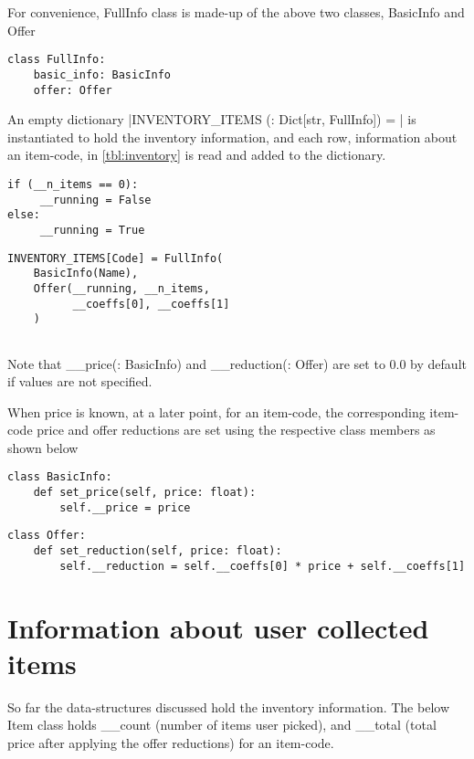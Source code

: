 \documentclass[11pt,a4paper,oneside,onecolumn]{article}
\begin{document}
For convenience, FullInfo class is made-up of the above two classes, BasicInfo and Offer

\begin{verbatim}
class FullInfo:
    basic_info: BasicInfo
    offer: Offer
\end{verbatim}

 An empty dictionary 
  |INVENTORY_ITEMS (: Dict[str, FullInfo]) = {}|
 is instantiated to hold the inventory information, and each row,
 information about an item-code, in \cref{tbl:inventory} is read and added to the dictionary.
 
 \begin{multicols}{2}
 \begin{verbatim}
if (__n_items == 0):
     __running = False
else:
     __running = True
     \end{verbatim}
     
     
\vfill

\begin{verbatim}
INVENTORY_ITEMS[Code] = FullInfo(
    BasicInfo(Name),
    Offer(__running, __n_items,
          __coeffs[0], __coeffs[1]
    )
 	
 \end{verbatim}
 \end{multicols}

Note that \_\_price(: BasicInfo) and \_\_reduction(: Offer) are set to $0.0$ by default 
if values are not specified.

When price is known, at a later point, for an item-code, the corresponding item-code price
and offer reductions are set using the respective class members as shown below

\begin{verbatim}
class BasicInfo:
    def set_price(self, price: float):
        self.__price = price
\end{verbatim}

\begin{verbatim}
class Offer:
    def set_reduction(self, price: float):
        self.__reduction = self.__coeffs[0] * price + self.__coeffs[1]	
\end{verbatim}

\section{Information about user collected items}
 
So far the data-structures discussed hold the inventory information.
The below Item class holds \_\_count (number of items user picked), 
and \_\_total (total price after applying the offer reductions) 
for an item-code.
\end{document}
